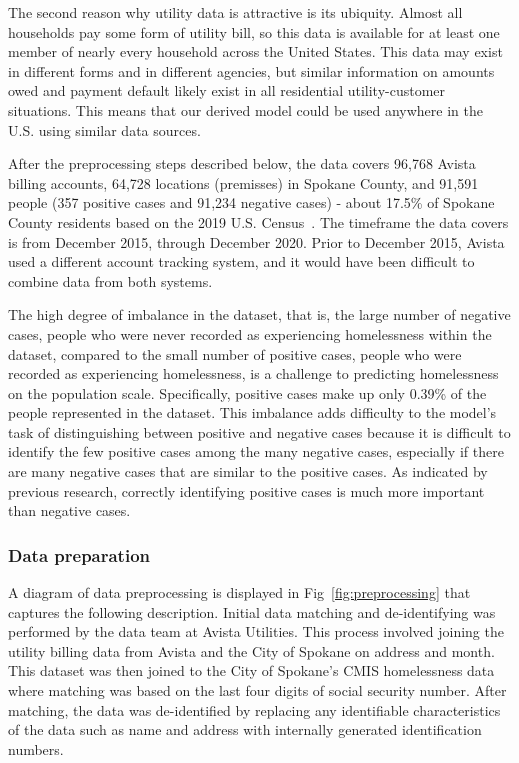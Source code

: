 \documentclass[10pt,letterpaper]{article}
\begin{document}
The second reason why utility data is attractive is its ubiquity. Almost all households pay some form of utility bill, so this data is available for at least one member of nearly every household across the United States. This data may exist in different forms and in different agencies, but similar information on amounts owed and payment default likely exist in all residential utility-customer situations. This means that our derived model could be used anywhere in the U.S. using similar data sources.

After the preprocessing steps described below, the data covers 96,768 Avista billing accounts, 64,728 locations (premisses) in Spokane County, and 91,591 people (357 positive cases and 91,234 negative cases) - about 17.5\% of Spokane County residents based on the 2019 U.S. Census~\cite{SpokanePop}. The timeframe the data covers is from December 2015, through December 2020. Prior to December 2015, Avista used a different account tracking system, and it would have been difficult to combine data from both systems. 

The high degree of imbalance in the dataset, that is, the large number of negative cases, people who were never recorded as experiencing homelessness within the dataset, compared to the small number of positive cases, people who were recorded as experiencing homelessness, is a challenge to predicting homelessness on the population scale. Specifically, positive cases make up only 0.39\% of the people represented in the dataset. This imbalance adds difficulty to the model's task of distinguishing between positive and negative cases because it is difficult to identify the few positive cases among the many negative cases, especially if there are many negative cases that are similar to the positive cases. As indicated by previous research, correctly identifying positive cases is much more important than negative cases.

\subsubsection*{Data preparation}
A diagram of data preprocessing is displayed in Fig~\ref{fig:preprocessing} that captures the following description. Initial data matching and de-identifying was performed by the data team at Avista Utilities. This process involved joining the utility billing data from Avista and the City of Spokane on address and month. This dataset was then joined to the City of Spokane's CMIS homelessness data where matching was based on the last four digits of social security number. After matching, the data was de-identified by replacing any identifiable characteristics of the data such as name and address with internally generated identification numbers. 
\end{document}
